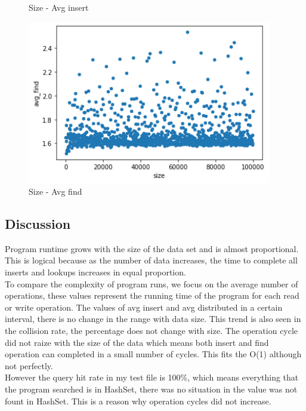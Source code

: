 \documentclass[a4]{article}
\begin{document}
\begin{figure}[H]
\begin{minipage}{0.48\textwidth}
    \caption{Size - Avg insert}
    \end{minipage}
    \begin{minipage}{0.48\textwidth}
    \includegraphics[width=0.95\textwidth]{h-size-find.png}
    \caption{Size - Avg find}
    \end{minipage}
\end{figure}

\subsection{Discussion}

Program runtime grows with the size of the data set and is almost proportional. This is logical because as the number of data increases, the time to complete all inserts and lookups increases in equal proportion.\\

\noindent To compare the complexity of program runs, we focus on the average number of operations, these values represent the running time of the program for each read or write operation. The values of avg insert and avg distributed in a certain interval, there is no change in the range with data size. This trend is also seen in the collision rate, the percentage does not change with size. The operation cycle did not raize with the size of the data which means both insert and find operation can completed in a small number of cycles. This fits the O(1) although not perfectly.\\

\noindent However the query hit rate in my test file is 100\%, which means everything that the program searched is in HashSet, there was no situation in the value was not fount in HashSet. This is a reason why operation cycles did not increase.\\
\end{document}
